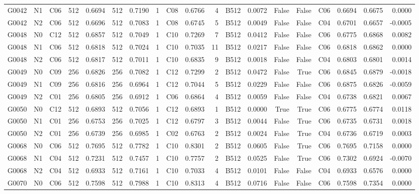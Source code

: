 \begin{tabular}{lllrrrrrlrrlrrrlrrr}
G0042 & N1 & C06 & 512 & 0.6694 & 512 & 0.7190 & 1 & C08 & 0.6766 & 4 & B512 & 0.0072 & False & False & C06 & 0.6694 & 0.6675 & 0.0000 \\
G0042 & N2 & C06 & 512 & 0.6696 & 512 & 0.7083 & 1 & C08 & 0.6745 & 5 & B512 & 0.0049 & False & False & C04 & 0.6701 & 0.6657 & -0.0005 \\
G0048 & N0 & C12 & 512 & 0.6857 & 512 & 0.7049 & 1 & C10 & 0.7269 & 7 & B512 & 0.0412 & False & False & C06 & 0.6775 & 0.6868 & 0.0082 \\
G0048 & N1 & C06 & 512 & 0.6818 & 512 & 0.7024 & 1 & C10 & 0.7035 & 11 & B512 & 0.0217 & False & False & C06 & 0.6818 & 0.6862 & 0.0000 \\
G0048 & N2 & C06 & 512 & 0.6817 & 512 & 0.7011 & 1 & C10 & 0.6835 & 9 & B512 & 0.0018 & False & False & C04 & 0.6803 & 0.6801 & 0.0014 \\
G0049 & N0 & C09 & 256 & 0.6826 & 256 & 0.7082 & 1 & C12 & 0.7299 & 2 & B512 & 0.0472 & False & True & C06 & 0.6845 & 0.6879 & -0.0018 \\
G0049 & N1 & C09 & 256 & 0.6816 & 256 & 0.6964 & 1 & C12 & 0.7044 & 5 & B512 & 0.0229 & False & False & C06 & 0.6875 & 0.6826 & -0.0059 \\
G0049 & N2 & C01 & 256 & 0.6805 & 256 & 0.6912 & 1 & C06 & 0.6864 & 4 & B512 & 0.0059 & False & False & C04 & 0.6738 & 0.6821 & 0.0067 \\
G0050 & N0 & C12 & 512 & 0.6893 & 512 & 0.7056 & 1 & C12 & 0.6893 & 1 & B512 & 0.0000 & True & True & C06 & 0.6775 & 0.6774 & 0.0118 \\
G0050 & N1 & C01 & 256 & 0.6753 & 256 & 0.7025 & 1 & C12 & 0.6797 & 3 & B512 & 0.0044 & False & True & C06 & 0.6735 & 0.6731 & 0.0018 \\
G0050 & N2 & C01 & 256 & 0.6739 & 256 & 0.6985 & 1 & C02 & 0.6763 & 2 & B512 & 0.0024 & False & True & C04 & 0.6736 & 0.6719 & 0.0003 \\
G0068 & N0 & C06 & 512 & 0.7695 & 512 & 0.7782 & 1 & C10 & 0.8301 & 2 & B512 & 0.0605 & False & True & C06 & 0.7695 & 0.7158 & 0.0000 \\
G0068 & N1 & C04 & 512 & 0.7231 & 512 & 0.7457 & 1 & C10 & 0.7757 & 2 & B512 & 0.0525 & False & True & C06 & 0.7302 & 0.6924 & -0.0070 \\
G0068 & N2 & C04 & 512 & 0.6933 & 512 & 0.7161 & 1 & C10 & 0.7033 & 4 & B512 & 0.0101 & False & False & C04 & 0.6933 & 0.6576 & 0.0000 \\
G0070 & N0 & C06 & 512 & 0.7598 & 512 & 0.7988 & 1 & C10 & 0.8313 & 4 & B512 & 0.0716 & False & False & C06 & 0.7598 & 0.7354 & 0.0000 \\

\end{tabular}
